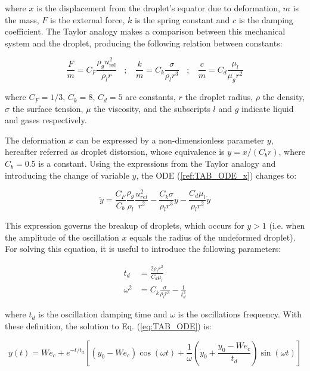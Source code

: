 where $x$ is the displacement from the droplet's equator due to deformation, $m$ is the mass, $F$ is the external force, $k$ is the spring constant and $c$ is the damping coefficient. The Taylor analogy makes a comparison between this mechanical system and the droplet, producing the following relation between constants:

\begin{equation}
\frac{F}{m} = C_F \frac{\rho_g u_\mathrm{rel}^2}{\rho_l r} ~~~~ ; ~~~~ \frac{k}{m} = C_k \frac{\sigma}{\rho_l r^3} ~~~~ ; ~~~~ \frac{c}{m} = C_d \frac{\mu_l}{\mu_g r^2}
\end{equation}

where $C_F = 1/3$, $C_k = 8$, $C_d = 5$ are constants, $r$ the droplet radius, $\rho$ the density, $\sigma$ the surface tension, $\mu$ the viscosity, and the subscripts $l$ and $g$ indicate liquid and gases respectively. 

The deformation $x$ can be expressed by a non-dimensionless parameter $y$, hereafter referred as droplet distorsion, whose equivalence is $y = x / \left( C_b r \right)$, where $C_b = 0.5$ is a constant. Using the expressions from the Taylor analogy and introducing the change of variable $y$, the ODE (\ref{ref:TAB_ODE_x}) changes to:

\begin{equation}
\label{eq:TAB_ODE}
\ddot{y} = \frac{C_F}{C_b} \frac{\rho_g}{\rho_l} \frac{u_{rel}^2}{r^2} - \frac{C_k \sigma}{\rho_l r^3} y - \frac{C_d \mu_l}{\rho_l r^2} \dot{y}
\end{equation}

This expression governs the breakup of droplets, which occurs for $y > 1$ (i.e. when the amplitude of the oscillation $x$ equals the radius of the undeformed droplet). For solving this equation, it is useful to introduce the following parameters:

\begin{subequations}
\label{eq:TAB_td_omega_definition}
\begin{align}
t_d &= \frac{2 \rho_l r^2}{C_d \mu_l} \\
\omega^2 &= C_k \frac{\sigma}{\rho_l r^3} - \frac{1}{t_d^2}
\end{align}
\end{subequations}

where $t_d$ is the oscillation damping time and $\omega$ is the oscillations frequency. With these definition, the solution to Eq. (\ref{eq:TAB_ODE}) is:

\begin{equation}
\label{eq:yTAB_equation_general}
y \left( t \right) = We_c + e^{- t / t_d} \left[ \left( y_0 - We_c \right) \cos \left( \omega t \right) + \frac{1}{\omega}\left( \dot{y}_0 + \frac{y_0 - We_c}{t_d} \right) \sin \left( \omega t \right)   \right]
\end{equation}

